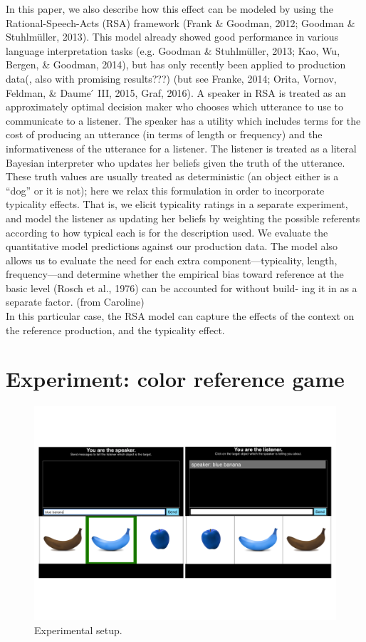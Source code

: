 \documentclass[10pt,letterpaper]{article}
\begin{document}
In this paper, we also describe how this effect can be modeled by using the Rational-Speech-Acts (RSA) framework (Frank \& Goodman, 2012; Goodman \& Stuhlmüller, 2013). This model already showed good performance in various language interpretation tasks (e.g. Goodman \& Stuhlmüller, 2013; Kao, Wu, Bergen, \& Goodman, 2014), but has only recently been applied to production data(, also with promising results???) (but see Franke, 2014; Orita, Vornov, Feldman, \& Daume ́ III, 2015, Graf, 2016). 
A speaker in RSA is treated as an approximately optimal decision maker who chooses which utterance to use to communicate to a listener. The speaker has a utility which includes terms for the cost of producing an utterance (in terms of length or frequency) and the informativeness of the utterance for a listener. The listener is treated as a literal Bayesian interpreter who updates her beliefs given the truth of the utterance. These truth values are usually treated as deterministic (an object either is a “dog” or it is not); here we relax this formulation in order to incorporate typicality effects. That is, we elicit typicality ratings in a separate experiment, and model the listener as updating her beliefs by weighting the possible referents according to how typical each is for the description used. We evaluate the quantitative model predictions against our production data. The model also allows us to evaluate the need for each extra component—typicality, length, frequency—and determine whether the empirical bias toward reference at the basic level (Rosch et al., 1976) can be accounted for without build- ing it in as a separate factor.  (from Caroline)\\
In this particular case, the RSA model can capture the effects of the context on the reference production, and the typicality effect.

\section{Experiment: color reference game}

\begin{figure}[bt!]
	\centering
	\includegraphics[width=.5\textwidth]{graphs/design_0}
	\caption{Experimental setup.
	}
	\label{fig:design_0}
\end{figure}
\end{document}
